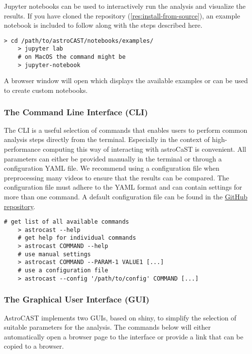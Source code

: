 Jupyter notebooks can be used to interactively run the analysis and visualize the results.
If you have cloned the repository (\ref{res:install-from-source}), an example notebook is included to follow along with the steps described here.

\begin{lstlisting}[style=bashStyle]
    > cd /path/to/astroCAST/notebooks/examples/
    > jupyter lab
    # on MacOS the command might be
    > jupyter-notebook
\end{lstlisting}

A browser window will open which displays the available examples or can be used to create custom notebooks.

\subsubsection{The Command Line Interface (CLI)}

The \ac{CLI} is a useful selection of commands that enables users to perform common analysis steps directly from the terminal. Especially in the context of high-performance computing this way of interacting with astroCaST is convenient. All parameters can either be provided manually in the terminal or through a configuration YAML file. We recommend using a configuration file when preprocessing many videos to ensure that the results can be compared. The configuration file must adhere to the YAML format and can contain settings for more than one command. A default configuration file can be found in the \href{https://github.com/janreising/astroCAST/blob/3ad41d03068732419df7fdde9b2a0f449898d4e2/config.yaml}{GitHub repository}.

\begin{lstlisting}[style=bashStyle]
    # get list of all available commands
    > astrocast --help
    # get help for individual commands
    > astrocast COMMAND --help
    # use manual settings
    > astrocast COMMAND --PARAM-1 VALUE1 [...]
    # use a configuration file
    > astrocast --config '/path/to/config' COMMAND [...]
\end{lstlisting}

\subsubsection{The Graphical User Interface (GUI)}

AstroCAST implements two \ac{GUI}s, based on shiny\citep{chang_shiny_2024}, to simplify the selection of suitable parameters for the analysis. The commands below will either automatically open a browser page to the interface or provide a link that can be copied to a browser.


